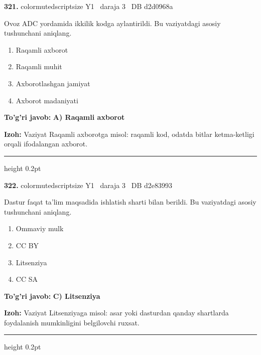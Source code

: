 \documentclass[10pt,a4paper,oneside]{article}
\begin{document}
\noindent\textbf{\color{ink}321.}  {color{muted}scriptsize Y1 \textbullet\ daraja 3 \textbullet\ DB d2d0968a}
\par
Ovoz ADC yordamida ikkilik kodga aylantirildi. Bu vaziyatdagi asosiy tushunchani aniqlang.
\begin{enumerate}[label=\Alph*),leftmargin=9mm]
\item Raqamli axborot
\item Raqamli muhit
\item Axborotlashgan jamiyat
\item Axborot madaniyati
\end{enumerate}
\begin{tcolorbox}[enhanced,breakable,colback=teal!4,colframe=teal!50!black,boxrule=0.5pt,arc=1.1mm,left=3mm,right=3mm,top=1.7mm,bottom=1.7mm,before skip=2mm,after skip=2mm]
\textbf{\color{teal}To'g'ri javob:} \textbf{A) Raqamli axborot}
\par\smallskip
\textbf{Izoh:} Vaziyat Raqamli axborotga misol: raqamli kod, odatda bitlar ketma-ketligi orqali ifodalangan axborot.
\end{tcolorbox}
\vspace{2mm}\hrule height 0.2pt \vspace{3mm}

\noindent\textbf{\color{ink}322.}  {color{muted}scriptsize Y1 \textbullet\ daraja 3 \textbullet\ DB d2e83993}
\par
Dastur faqat ta'lim maqsadida ishlatish sharti bilan berildi. Bu vaziyatdagi asosiy tushunchani aniqlang.
\begin{enumerate}[label=\Alph*),leftmargin=9mm]
\item Ommaviy mulk
\item CC BY
\item Litsenziya
\item CC SA
\end{enumerate}
\begin{tcolorbox}[enhanced,breakable,colback=teal!4,colframe=teal!50!black,boxrule=0.5pt,arc=1.1mm,left=3mm,right=3mm,top=1.7mm,bottom=1.7mm,before skip=2mm,after skip=2mm]
\textbf{\color{teal}To'g'ri javob:} \textbf{C) Litsenziya}
\par\smallskip
\textbf{Izoh:} Vaziyat Litsenziyaga misol: asar yoki dasturdan qanday shartlarda foydalanish mumkinligini belgilovchi ruxsat.
\end{tcolorbox}
\vspace{2mm}\hrule height 0.2pt \vspace{3mm}
\end{document}
